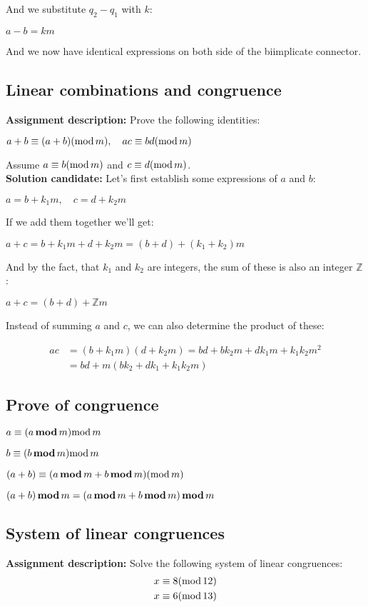 \documentclass{report}
\newcommand{\cent}[1]{\begin{center}#1\end{center}}
\newcommand{\mAlign}[1]{\begin{align*}#1\end{align*}}
\newcommand{\doubleZ}{\mathbb{Z}}
\newcommand{\AssignmentDescription}{\textbf{Assignment description: }}
\newcommand{\Solution}{\textbf{Solution candidate: }}
\newcommand{\QED}{\boxed{}}
\newcommand{\modInline}{\text{mod\,}}
\newcommand{\modFunc}{\text{\,\textbf{mod}\,}}
\begin{document}
	And we substitute $q_2 -q_1$ with $k$:
	
	\cent{$a-b=km$}
	
	
	And we now have identical expressions on both side of the biimplicate connector.\\
	\QED
	
	\subsection{Linear combinations and congruence}
	
	\AssignmentDescription
	Prove the following identities:
	
	\cent{$a+b \equiv (a+b) (\modInline m), \quad ac \equiv bd (\modInline m)$}
	
	Assume $a\equiv b (\modInline m)$ and $c \equiv d (\modInline m)$.\\
	
	\Solution
	Let's first establish some expressions of $a$ and $b$:
	
	\cent{$a = b + k_1m, \quad c = d + k_2 m$}
	
	If we add them together we'll get:
	
	\cent{$a +c  = b + k_1m + d + k_2m = (b+d) + (k_1+k_2)m$}
	
	And by the fact, that $k_1$ and $k_2$ are integers, the sum of these is also an integer $\doubleZ$:
	
	\cent{$a+c=(b+d)+\doubleZ m$}
	
	Instead of summing $a$ and $c$, we can also determine the product of these:
	
	\mAlign{ac  &= (b + k_1m)(d + k_2m) = bd + b k_2m + d k_1 m + k_1 k_2 m^2\\
					   &= bd + m(bk_2 + dk_1 + k_1k_2m)}
	
	\QED
	
 	\subsection{Prove of congruence}
 	
 	\cent{$a \equiv (a \modFunc m) \modInline m$}
 	\cent{$b \equiv (b \modFunc m) \modInline m$}
 	\cent{$(a+b) \equiv (a \modFunc m + b \modFunc m) (\modInline m)$}
 	\cent{$(a+b) \modFunc m = (a \modFunc m + b \modFunc m) \modFunc m$}
 	\subsection{System of linear congruences}
 	\AssignmentDescription
 	Solve the following system of linear congruences:
 	\mAlign{x &\equiv 8 (\modInline 12) \\
 				  x &\equiv 6 (\modInline 13)}
 	
\end{document}
